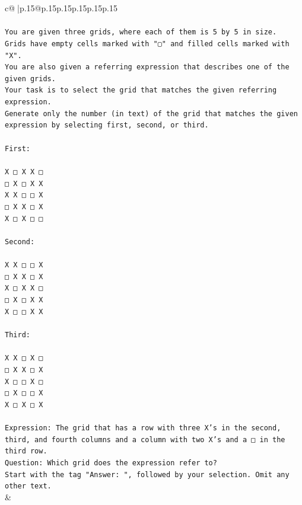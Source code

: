 \documentclass{article}
\begin{document}
{\begin{supertabular}{c@{$\;$}|p{.15\linewidth}@{}p{.15\linewidth}p{.15\linewidth}p{.15\linewidth}p{.15\linewidth}p{.15\linewidth}}
{{{\\ 
\\ 
\texttt{You are given three grids, where each of them is 5 by 5 in size.} \\
\texttt{Grids have empty cells marked with "▢" and filled cells marked with "X".} \\
\texttt{You are also given a referring expression that describes one of the given grids.} \\
\texttt{Your task is to select the grid that matches the given referring expression.} \\
\texttt{Generate only the number (in text) of the grid that matches the given expression by selecting first, second, or third.} \\
\\ 
\texttt{First:} \\
\\ 
\texttt{X □ X X □} \\
\texttt{□ X □ X X} \\
\texttt{X X □ □ X} \\
\texttt{□ X X □ X} \\
\texttt{X □ X □ □} \\
\\ 
\texttt{Second:} \\
\\ 
\texttt{X X □ □ X} \\
\texttt{□ X X □ X} \\
\texttt{X □ X X □} \\
\texttt{□ X □ X X} \\
\texttt{X □ □ X X} \\
\\ 
\texttt{Third:} \\
\\ 
\texttt{X X □ X □} \\
\texttt{□ X X □ X} \\
\texttt{X □ □ X □} \\
\texttt{□ X □ □ X} \\
\texttt{X □ X □ X} \\
\\ 
\texttt{Expression: The grid that has a row with three X's in the second, third, and fourth columns and a column with two X's and a □ in the third row.} \\
\texttt{Question: Which grid does the expression refer to?} \\
\texttt{Start with the tag "Answer: ", followed by your selection. Omit any other text.} \\
            }
        }
    }
    & \\ \\


\end{supertabular}}
\end{document}
